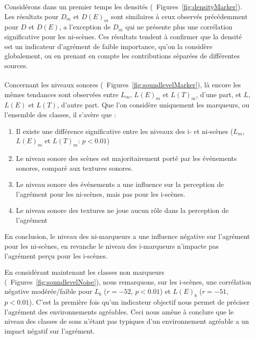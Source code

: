 Considérons dans un premier temps les densités (\cf~Figures~\ref{fig:densityMarker}). Les résultats pour $D_m$ et $D(E)_m$ sont similaires à ceux observés précédemment pour $D$ et $D(E)$, a l'exception de $D_m$  qui ne présente plus une corrélation significative pour les ni-scènes. Ces résultats tendent à confirmer que la densité est un indicateur d'agrément de faible importance, qu'on la considère globalement, ou en prenant en compte les contributions séparées de différentes sources. \\

 \\

Concernant les niveaux sonores (\cf~Figures~\ref{fig:soundlevelMarker}), là encore les mêmes tendances sont observées entre $L_m$, $L(E)_m$ et $L(T)_m$, d'une part, et $L$, $L(E)$ et $L(T)$, d'autre part. Que l'on considère uniquement les marqueurs, ou l'ensemble des classes, il s'avère que :

\begin{enumerate}
\item Il existe une différence significative entre les niveaux des i- et ni-scènes ($L_m$, $L(E)_m$ et $L(T)_m$: $p<0.01$) 
\item Le niveau sonore des scènes est majoritairement porté par les événements sonores, comparé aux textures sonores.
\item Le niveau sonore des événements a une influence sur la perception de l'agrément pour les ni-scènes, mais pas pour les i-scènes.
\item Le niveau sonore des textures ne joue aucun rôle dans la perception de l'agrément
\end{enumerate}

En conclusion, le niveau des ni-marqueurs a une influence négative sur l'agrément pour les ni-scènes, en revanche le niveau des i-marqueurs n’impacte pas l'agrément perçu pour les i-scènes.

En considérant maintenant les classes non marqueurs  (\cf~Figures~\ref{fig:soundlevelNoise}), nous remarquons, sur les i-scènes, une corrélation négative modérée/faible pour $L_b$  ($r=-52$, $p<0.01$) et $L(E)_b$ ($r=-51$, $p<0.01$). C'est la première fois qu'un indicateur objectif nous permet de préciser l'agrément des environnements agréables. Ceci nous amène à conclure que le niveau des classes de sons n'étant pas typiques d'un environnement agréable a un impact négatif sur l'agrément. 

